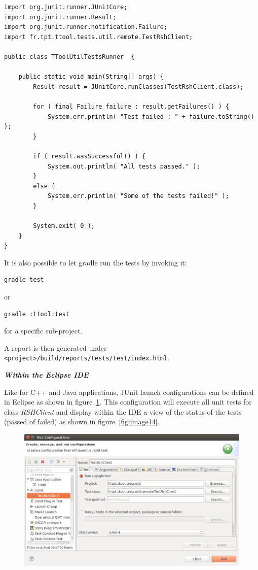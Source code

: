 \documentclass[12pt]{article}
\begin{document}
\begin{verbatim}
import org.junit.runner.JUnitCore;
import org.junit.runner.Result;
import org.junit.runner.notification.Failure;
import fr.tpt.ttool.tests.util.remote.TestRshClient;

public class TToolUtilTestsRunner  {

    public static void main(String[] args) {
        Result result = JUnitCore.runClasses(TestRshClient.class);

        for ( final Failure failure : result.getFailures() ) { 
            System.err.println( "Test failed : " + failure.toString() );
        }
 		
        if ( result.wasSuccessful() ) {
            System.out.println( "All tests passed." );
        }
        else {
            System.err.println( "Some of the tests failed!" );
        }
 
        System.exit( 0 );
    }
}
\end{verbatim}

It is also possible to let gradle run the tests by invoking it:
\begin{verbatim}
gradle test
\end{verbatim}
or
\begin{verbatim}
gradle :ttool:test
\end{verbatim}

for a specific sub-project.

A report is then generated under
\texttt{<project>/build/reports/tests/test/index.html}.

\textbf{\emph{Within the Eclipse IDE}}

Like for C++ and Java applications, JUnit launch configurations can be defined
in Eclipse as shown in figure~\ref{fig:image13}. This configuration will execute all unit tests
for class \textit{RSHClient} and display within the IDE a view of the status of
the tests (passed of failed) as shown in figure~\ref{fig:image14}.

\begin{figure}[H]
\begin{center}
\includegraphics[width=\textwidth]{images/image13.png}
\end{center}
\caption{}
\label{fig:image13}
\end{figure}
\end{document}
